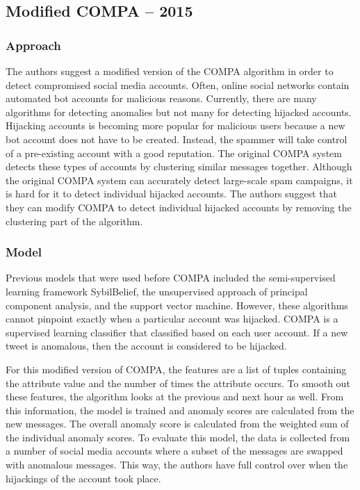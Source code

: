 \documentclass[11pt, oneside]{article}   	%
\begin{document}
\subsection*{Modified COMPA -- 2015}

\subsubsection*{Approach}

\quad The authors suggest a modified version of the COMPA algorithm in order to detect compromised social media accounts.
Often, online social networks contain automated bot accounts for malicious reasons.
Currently, there are many algorithms for detecting anomalies but not many for detecting hijacked accounts.
Hijacking accounts is becoming more popular for malicious users because a new bot account does not have to be created.
Instead, the spammer will take control of a pre-existing account with a good reputation.
The original COMPA system detects these types of accounts by clustering similar messages together.
Although the original COMPA system can accurately detect large-scale spam campaigns, it is hard for it to detect individual hijacked accounts.
The authors suggest that they can modify COMPA to detect individual hijacked accounts by removing the clustering part of the algorithm.

\subsubsection*{Model}

\quad Previous models that were used before COMPA included the semi-supervised learning framework SybilBelief, the unsupervised approach of principal component analysis, and the support vector machine.
However, these algorithms cannot pinpoint exactly when a particular account was hijacked.
COMPA is a supervised learning classifier that classified based on each user account.
If a new tweet is anomalous, then the account is considered to be hijacked.

\quad For this modified version of COMPA, the features are a list of tuples containing the attribute value and the number of times the attribute occurs.
To smooth out these features, the algorithm looks at the previous and next hour as well.
From this information, the model is trained and anomaly scores are calculated from the new messages.
The overall anomaly score is calculated from the weighted sum of the individual anomaly scores.
To evaluate this model, the data is collected from a number of social media accounts where a subset of the messages are swapped with anomalous messages.
This way, the authors have full control over when the hijackings of the account took place.
\end{document}
